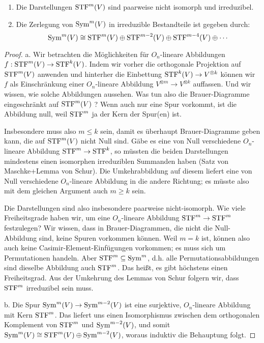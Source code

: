 \begin{theorem}
\begin{enumerate}
\item Die Darstellungen $\operatorname{STF}^m(V)$ sind paarweise nicht isomorph und irreduzibel.
\item Die Zerlegung von $\operatorname{Sym}^m(V)$ in irreduzible Bestandteile ist gegeben durch:
\[\operatorname{Sym}^m(V) \cong \operatorname{STF}^m(V) \oplus \operatorname{STF}^{m-2}(V) \oplus \operatorname{STF}^{m-4}(V) \oplus \cdots\]
\end{enumerate}
\end{theorem}
\begin{proof}
a. Wir betrachten die Möglichkeiten für $O_n$-lineare Abbildungen $f: \operatorname{STF}^m(V) \to \operatorname{STF}^k(V)$. Indem wir vorher die orthogonale Projektion auf $\operatorname{STF}^m(V)$ anwenden und hinterher die Einbettung $\operatorname{STF}^k(V) \to V^{\otimes k}$ können wir $f$ als Einschränkung einer $O_n$-lineare Abbildung $V^{\otimes m} \to V^{\otimes k}$ auffassen. Und wir wissen, wie solche Abbildungen aussehen. Was tun also die Brauer-Diagramme eingeschränkt auf $\operatorname{STF}^m(V)$ ? Wenn auch nur eine Spur vorkommt, ist die Abbildung null, weil $\operatorname{STF}^m$ ja der Kern der Spur(en) ist.

Insbesondere muss also $m\leq k$ sein, damit es überhaupt Brauer-Diagramme geben kann, die auf $\operatorname{STF}^m(V)$ nicht Null sind. Gäbe es eine von Null verschiedene $O_n$-lineare Abbildung $\operatorname{STF}^m\to \operatorname{STF}^k$, so müssten die beiden Darstellungen mindestens einen isomorphen irreduziblen Summanden haben (Satz von Maschke+Lemma von Schur). Die Umkehrabbildung auf diesem liefert eine von Null verschiedene $O_n$-lineare Abbildung in die andere Richtung; es müsste also mit dem gleichen Argument auch $m\geq k$ sein.

Die Darstellungen sind also insbesondere paarweise nicht-isomorph. Wie viele Freiheitsgrade haben wir, um eine $O_n$-lineare Abbildung $\operatorname{STF}^m\to \operatorname{STF}^m$ festzulegen? Wir wissen, dass in Brauer-Diagrammen, die nicht die Null-Abbildung sind, keine Spuren vorkommen können. Weil $m=k$ ist, können also auch keine Casimir-Element-Einfügungen vorkommen; es muss sich um Permutationen handeln. Aber $\operatorname{STF}^m \subseteq\operatorname{Sym}^m$, d.h. alle Permutationsabbildungen sind dieselbe Abbildung auch $\operatorname{STF}^m$. Das heißt, es gibt höchstens einen Freiheitsgrad. Aus der Umkehrung des Lemmas von Schur folgern wir, dass $\operatorname{STF}^m$ irreduzibel sein muss.

\medbreak
b. Die Spur $\operatorname{Sym}^m(V) \to \operatorname{Sym}^{m-2}(V)$ ist eine surjektive, $O_n$-lineare Abbildung mit Kern $\operatorname{STF}^m$. Das liefert uns einen Isomorphismus zwischen dem orthogonalen Komplement von $\operatorname{STF}^m$ und $\operatorname{Sym}^{m-2}(V)$, und somit $\operatorname{Sym}^m(V) \cong \operatorname{STF}^m(V) \oplus \operatorname{Sym}^{m-2}(V)$, woraus induktiv die Behauptung folgt.
\end{proof}